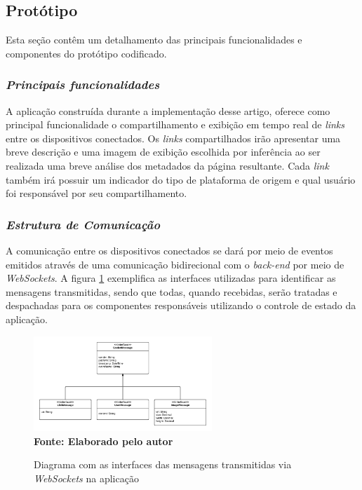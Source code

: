 \subsection{Protótipo}

Esta seção contêm um detalhamento das principais funcionalidades e componentes do protótipo codificado.

\subsubsection{{\it Principais funcionalidades}}

A aplicação construída durante a implementação desse artigo, oferece como principal funcionalidade o compartilhamento e exibição em tempo real de \textit{links} entre os dispositivos conectados.
Os \textit{links} compartilhados irão apresentar uma breve descrição e uma imagem de exibição escolhida por inferência ao ser realizada uma breve análise dos metadados da página resultante. Cada \textit{link} também irá possuir um indicador do tipo de plataforma de origem e qual usuário foi responsável por seu compartilhamento.

\subsubsection{{\it Estrutura de Comunicação}}

A comunicação entre os dispositivos conectados se dará por meio de eventos emitidos através de uma comunicação bidirecional com o \textit{back-end} por meio de \textit{WebSockets}. A figura \ref{fig:figura2} exemplifica as interfaces utilizadas para identificar as mensagens transmitidas, sendo que todas, quando recebidas, serão tratadas e despachadas para os componentes responsáveis utilizando o controle de estado da aplicação.

\begin{figure}[ht]
	\centering	
	\caption[\hspace{0.1cm}Diagrama com as interfaces das mensagens transmitidas via \textit{WebSockets} na aplicação.]{Diagrama com as interfaces das mensagens transmitidas via \textit{WebSockets} na aplicação}
	\vspace{-0.4cm}
	\includegraphics[width=0.6\textwidth]{figuras/SocketInterfaces.png}
	\vspace{-0.2cm}
	\\\textbf{\footnotesize Fonte: Elaborado pelo autor }
	\label{fig:figura2}
\end{figure}
\vspace{-0.5cm}

